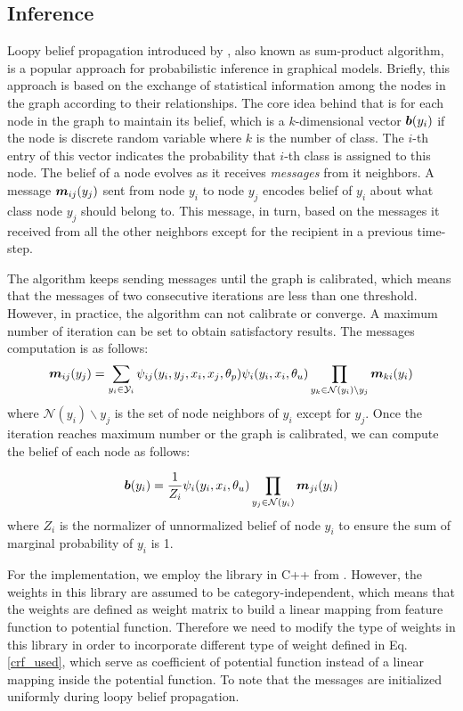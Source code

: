 \subsection{Inference}
Loopy belief propagation introduced by \cite{pearl2014probabilistic}, also known as sum-product algorithm, is a popular approach for probabilistic inference in graphical models. Briefly, this approach is based on the exchange of statistical information among the nodes in the graph according to their relationships. The core idea behind that is for each node in the graph to maintain its belief, which is a $k$-dimensional vector $\boldsymbol b(y_i)$ if the node is discrete random variable where $k$ is the number of class. The $i$-th entry of this vector indicates the probability that $i$-th class is assigned to this node. The belief of a node evolves as it receives \textit{messages} from it neighbors. A message $\boldsymbol m_{ij}(y_j)$ sent from node $y_i$ to node $y_j$ encodes belief of $y_i$ about what class node $y_j$ should belong to. This message, in turn, based on the messages it received from all the other neighbors except for the recipient in a previous time-step.

The algorithm keeps sending messages until the graph is calibrated, which means that the messages of two consecutive iterations are less than one threshold. However, in practice, the algorithm can not calibrate or converge. A maximum number of iteration can be set to obtain satisfactory results. The messages computation is as follows:
\begin{equation}
\label{message}
\boldsymbol m_{ij}(y_j) = \sum_{y_i\in \mathcal{Y}_i}\psi_{ij}(y_i, y_j, x_i, x_j, \theta_p)\psi_i(y_i, x_i, \theta_u) \prod_{y_k\in\mathcal{N}(y_i)\backslash y_j}\boldsymbol m_{ki}(y_i)
\end{equation}
where $\mathcal{N}(y_i) \backslash y_j$ is the set of node neighbors of $y_i$ except for $y_j$. Once the iteration reaches maximum number or the graph is calibrated, we can compute the belief of each node as follows:

\begin{equation}
\label{belief}
\boldsymbol b(y_i) = \frac{1}{Z_i}\psi_i(y_i, x_i, \theta_u) \prod_{y_j\in\mathcal{N}(y_i)}\boldsymbol m_{ji}(y_i)
\end{equation}
where $Z_i$ is the normalizer of unnormalized belief of node $y_i$ to ensure the sum of marginal probability of $y_i$ is 1. 

For the implementation, we employ the library in C++ from \cite{Ruiz-Sarmiento-REACTS-2015}. However, the weights in this library are assumed to be category-independent, which means that the weights are defined as weight matrix to build a linear mapping from feature function to potential function. Therefore we need to modify the type of weights in this library in order to incorporate different type of weight defined in Eq. \ref{crf_used}, which serve as coefficient of potential function instead of a linear mapping inside the potential function. To note that the messages are initialized uniformly during loopy belief propagation.

